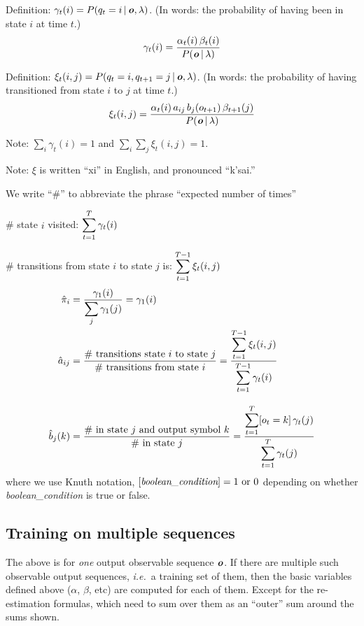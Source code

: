 Definition: $\gamma_t(i) = P(q_t=i \operatorname*{\vert} \boldsymbol{\mathit{o}}, \lambda)$.  (In
words: the probability of having been in state $i$ at time $t$.)
\begin{equation*}
  \gamma_t(i) =
  \frac{\alpha_t(i) \, \beta_t(i)}{P(\boldsymbol{\mathit{o}} \operatorname*{\vert} \lambda)}
\end{equation*}

Definition: $\xi_t(i,j) = P(q_t=i, q_{t+1}=j \operatorname*{\vert} \boldsymbol{\mathit{o}}, \lambda)$.
(In words: the probability of having transitioned from state $i$ to
$j$ at time $t$.)
\begin{equation*}
  \xi_t(i,j) =
  \frac
  {\alpha_t(i) \, a_{ij} \, b_j(o_{t+1}) \, \beta_{t+1}(j)}
  {P(\boldsymbol{\mathit{o}} \operatorname*{\vert} \lambda)}
\end{equation*}

Note: $\sum_i \gamma_t(i) = 1$ and $\sum_i \sum_j \xi_t(i,j) = 1$.

Note: $\xi$ is written ``xi'' in English, and pronounced ``k'sai.''

We write ``\#'' to abbreviate the phrase ``expected number of times''

\# state $i$ visited: $\displaystyle\sum_{t=1}^T \gamma_t(i)$

\# transitions from state $i$ to state $j$ is:
$\displaystyle\sum_{t=1}^{T-1} \xi_t(i,j)$
\begin{align*}
  \hat{\pi}_i &= \frac{\gamma_1(i)}{\displaystyle\sum_j \gamma_1(j)} = \gamma_1(i)
  \\
  \hat{a}_{ij} &= \frac{\text{\# transitions state $i$ to state
  $j$}}{\text{\# transitions from state $i$}}
  = \frac{\displaystyle\sum_{t=1}^{T-1}  \xi_t(i,j)}{\displaystyle\sum_{t=1}^{T-1} \gamma_t(i)}
  \\[2ex]
  \hat{b}_j(k)
  &= \frac{\text{\# in state $j$ and output symbol $k$}}{\text{\# in state $j$}}
  = \frac{\displaystyle\sum_{t=1}^T [o_t=k] \, \gamma_t(j)}
	 {\displaystyle\sum_{t=1}^T \gamma_t(j)}
\end{align*}
where we use Knuth notation, $[\emph{boolean\_condition}] = \text{1 or
0}$ depending on whether \emph{boolean\_condition} is true or false.

\subsection{Training on multiple sequences}

The above is for \emph{one} output observable sequence $\boldsymbol{\mathit{o}}$.  If
there are multiple such observable output sequences, \emph{i.e.}\ a
training set of them, then the basic variables defined above
($\alpha$, $\beta$, etc) are computed for each of them.  Except for
the re-estimation formulas, which need to sum over them as an
``outer'' sum around the sums shown.

